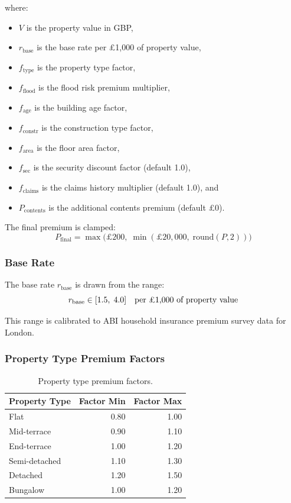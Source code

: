 \documentclass[11pt,a4paper]{article}
\begin{document}
\noindent where:
\begin{itemize}[nosep]
    \item $V$ is the property value in GBP,
    \item $r_{\mathrm{base}}$ is the base rate per \pounds1,000 of property value,
    \item $f_{\mathrm{type}}$ is the property type factor,
    \item $f_{\mathrm{flood}}$ is the flood risk premium multiplier,
    \item $f_{\mathrm{age}}$ is the building age factor,
    \item $f_{\mathrm{constr}}$ is the construction type factor,
    \item $f_{\mathrm{area}}$ is the floor area factor,
    \item $f_{\mathrm{sec}}$ is the security discount factor (default 1.0),
    \item $f_{\mathrm{claims}}$ is the claims history multiplier (default 1.0), and
    \item $P_{\mathrm{contents}}$ is the additional contents premium (default \pounds0).
\end{itemize}

\noindent The final premium is clamped:
\begin{equation}
P_{\mathrm{final}} = \max\bigl(\pounds200,\;\min(\pounds20{,}000,\;\text{round}(P, 2))\bigr)
\end{equation}

\subsubsection{Base Rate}

The base rate $r_{\mathrm{base}}$ is drawn from the range:
\[
r_{\mathrm{base}} \in [1.5,\; 4.0] \quad \text{per \pounds1,000 of property value}
\]

\noindent This range is calibrated to ABI household insurance premium
survey data for London.

\subsubsection{Property Type Premium Factors}

\begin{table}[H]
\centering
\caption{Property type premium factors.}
\label{tab:type_premium}
\begin{tabular}{lrr}
\toprule
\textbf{Property Type} & \textbf{Factor Min} & \textbf{Factor Max} \\
\midrule
Flat            & 0.80 & 1.00 \\
Mid-terrace     & 0.90 & 1.10 \\
End-terrace     & 1.00 & 1.20 \\
Semi-detached   & 1.10 & 1.30 \\
Detached        & 1.20 & 1.50 \\
Bungalow        & 1.00 & 1.20 \\
\bottomrule
\end{tabular}
\end{table}
\end{document}

